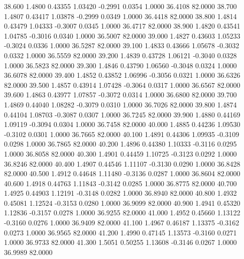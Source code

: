   38.600   1.4800   0.43355   1.03420  -0.2991   0.0354   1.0000  36.4108  82.0000
  38.700   1.4807   0.43417   1.03878  -0.2999   0.0349   1.0000  36.4418  82.0000
  38.800   1.4814   0.43479   1.04333  -0.3007   0.0345   1.0000  36.4717  82.0000
  38.900   1.4820   0.43541   1.04785  -0.3016   0.0340   1.0000  36.5007  82.0000
  39.000   1.4827   0.43603   1.05233  -0.3024   0.0336   1.0000  36.5287  82.0000
  39.100   1.4833   0.43666   1.05678  -0.3032   0.0332   1.0000  36.5559  82.0000
  39.200   1.4839   0.43728   1.06121  -0.3040   0.0328   1.0000  36.5823  82.0000
  39.300   1.4846   0.43790   1.06560  -0.3048   0.0324   1.0000  36.6078  82.0000
  39.400   1.4852   0.43852   1.06996  -0.3056   0.0321   1.0000  36.6326  82.0000
  39.500   1.4857   0.43914   1.07428  -0.3064   0.0317   1.0000  36.6567  82.0000
  39.600   1.4863   0.43977   1.07857  -0.3072   0.0314   1.0000  36.6800  82.0000
  39.700   1.4869   0.44040   1.08282  -0.3079   0.0310   1.0000  36.7026  82.0000
  39.800   1.4874   0.44104   1.08703  -0.3087   0.0307   1.0000  36.7245  82.0000
  39.900   1.4880   0.44169   1.09119  -0.3094   0.0304   1.0000  36.7458  82.0000
  40.000   1.4885   0.44236   1.09530  -0.3102   0.0301   1.0000  36.7665  82.0000
  40.100   1.4891   0.44306   1.09935  -0.3109   0.0298   1.0000  36.7865  82.0000
  40.200   1.4896   0.44380   1.10333  -0.3116   0.0295   1.0000  36.8058  82.0000
  40.300   1.4901   0.44459   1.10725  -0.3123   0.0292   1.0000  36.8246  82.0000
  40.400   1.4907   0.44546   1.11107  -0.3130   0.0290   1.0000  36.8428  82.0000
  40.500   1.4912   0.44648   1.11480  -0.3136   0.0287   1.0000  36.8604  82.0000
  40.600   1.4918   0.44763   1.11843  -0.3142   0.0285   1.0000  36.8775  82.0000
  40.700   1.4925   0.44903   1.12191  -0.3148   0.0282   1.0000  36.8940  82.0000
  40.800   1.4932   0.45081   1.12524  -0.3153   0.0280   1.0000  36.9099  82.0000
  40.900   1.4941   0.45320   1.12836  -0.3157   0.0278   1.0000  36.9255  82.0000
  41.000   1.4952   0.45660   1.13122  -0.3160   0.0276   1.0000  36.9409  82.0000
  41.100   1.4967   0.46187   1.13375  -0.3162   0.0273   1.0000  36.9565  82.0000
  41.200   1.4990   0.47145   1.13573  -0.3160   0.0271   1.0000  36.9733  82.0000
  41.300   1.5051   0.50255   1.13608  -0.3146   0.0267   1.0000  36.9989  82.0000
